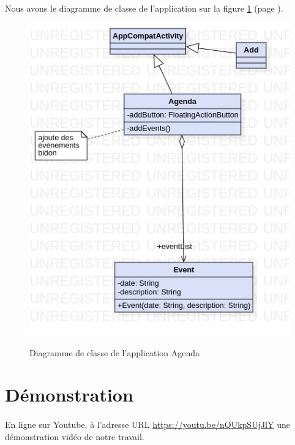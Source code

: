\documentclass[a4paper]{article}
\begin{document}
\begin{multicols}{2}
    \paragraph{}
      Nous avons le diagramme de classe de l'application sur la figure \ref{fig:agendaClass} (page \pageref{fig:agendaClass}).
    \begin{figure}
      \centering
      \caption{Diagramme de classe de l'application Agenda}
      \includegraphics[height=\textwidth]{jpg/Model!Agenda_0}
      \label{fig:agendaClass}
    \end{figure}
    \section*{Démonstration}
      \paragraph{}
        En ligne sur Youtube, à l'adresse URL \url{https://youtu.be/nQUkpSUjJlY} une démonstration vidéo de notre travail.
  \end{multicols}
\end{document}
